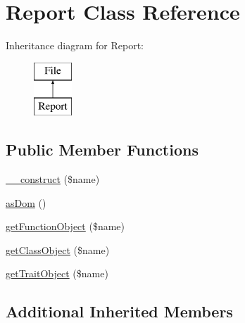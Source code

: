 \hypertarget{class_sebastian_bergmann_1_1_code_coverage_1_1_report_1_1_xml_1_1_report}{}\section{Report Class Reference}
\label{class_sebastian_bergmann_1_1_code_coverage_1_1_report_1_1_xml_1_1_report}
Inheritance diagram for Report\+:\begin{figure}[H]
\begin{center}
\leavevmode
\includegraphics[height=2.000000cm]{class_sebastian_bergmann_1_1_code_coverage_1_1_report_1_1_xml_1_1_report}
\end{center}
\end{figure}
\subsection*{Public Member Functions}
\begin{DoxyCompactItemize}
\item 
\mbox{\hyperlink{class_sebastian_bergmann_1_1_code_coverage_1_1_report_1_1_xml_1_1_report_a4717bbfc70a40a57ee741ed70766c309}{\+\_\+\+\_\+construct}} (\$name)
\item 
\mbox{\hyperlink{class_sebastian_bergmann_1_1_code_coverage_1_1_report_1_1_xml_1_1_report_a1b81c837661cbe4c672aeeee583f599d}{as\+Dom}} ()
\item 
\mbox{\hyperlink{class_sebastian_bergmann_1_1_code_coverage_1_1_report_1_1_xml_1_1_report_ad1d901f3b2d5e0b74a5b01c52d919b43}{get\+Function\+Object}} (\$name)
\item 
\mbox{\hyperlink{class_sebastian_bergmann_1_1_code_coverage_1_1_report_1_1_xml_1_1_report_a5c51ab72612d534d1a7d8563e1371e7b}{get\+Class\+Object}} (\$name)
\item 
\mbox{\hyperlink{class_sebastian_bergmann_1_1_code_coverage_1_1_report_1_1_xml_1_1_report_aacf0354497de5d810001220f7d245e1c}{get\+Trait\+Object}} (\$name)
\end{DoxyCompactItemize}
\subsection*{Additional Inherited Members}


